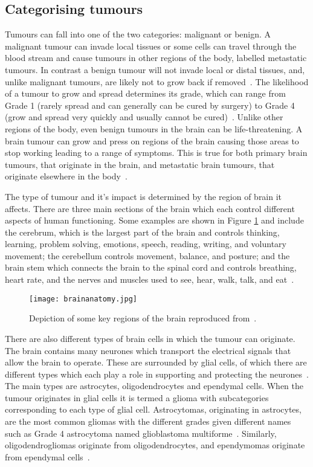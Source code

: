 \subsection{Categorising tumours} 
Tumours can fall into one of the two categories: malignant or benign. A malignant tumour can invade local tissues or some cells can travel through the blood stream and cause tumours in other regions of the body, labelled metastatic tumours. In contrast a benign tumour will not invade local or distal tissues, and, unlike malignant tumours, are likely not to grow back if removed~\cite{Institute2021}. The likelihood of a tumour to grow and spread determines its grade, which can range from Grade 1 (rarely spread and can generally can be cured by surgery) to Grade 4 (grow and spread very quickly and usually cannot be cured)~\cite{Institute2023}. Unlike other regions of the body, even benign tumours in the brain can be life-threatening. A brain tumour can grow and press on regions of the brain causing those areas to stop working leading to a range of symptoms. This is true for both primary brain tumours, that originate in the brain, and metastatic brain tumours, that originate elsewhere in the body~\cite{Institute2021}.

The type of tumour and it's impact is determined by the region of brain it affects. There are three main sections of the brain which each control different aspects of human functioning. Some examples are shown in Figure \ref{fig:anatomybrain} and include the cerebrum, which is the largest part of the brain and controls thinking, learning, problem solving, emotions, speech, reading, writing, and voluntary movement; the cerebellum controls movement, balance, and posture; and the brain stem which connects the brain to the spinal cord and controls breathing, heart rate, and the nerves and muscles used to see, hear, walk, talk, and eat~\cite{Institute2023}.
\begin{figure}[ht]
    \centering
    \texttt{[image: brainanatomy.jpg]}
    \caption{Depiction of some key regions of the brain reproduced from~\cite{Institute2023}.}
    \label{fig:anatomybrain}
\end{figure}
There are also different types of brain cells in which the tumour can originate. The brain contains many neurones which transport the electrical signals that allow the brain to operate. These are surrounded by glial cells, of which there are different types which each play a role in supporting and protecting the neurones~\cite{TheBrainTumourCharity2023}. The main types are astrocytes, oligodendrocytes and ependymal cells. When the tumour originates in glial cells it is termed a glioma with subcategories corresponding to each type of glial cell. Astrocytomas, originating in astrocytes, are the most common gliomas with the different grades given different names such as Grade 4 astrocytoma named glioblastoma multiforme~\cite{BrainTumourResearch2023}. Similarly, oligodendrogliomas originate from oligodendrocytes, and ependymomas originate from ependymal cells~\cite{TheBrainTumourCharity2023}. %

